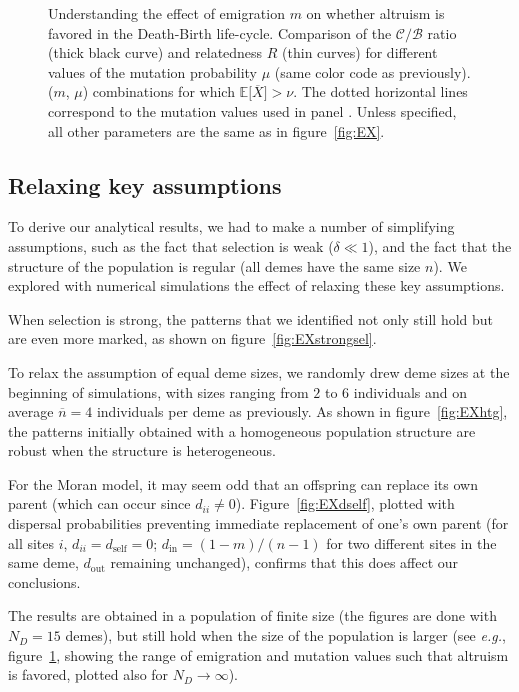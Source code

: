 \documentclass[11pt, letterpaper]{article}
\newcommand{\eg}{\textit{e.g.}}
\newcommand{\Esp}[1]{\mathbb{E}\big[ #1\big]}%
\newcommand{\mutbias}{\nu}
\newcommand{\self}{\textrm{self}}
\newcommand{\inn}{\textrm{in}}
\newcommand{\out}{\textrm{out}}
\newcommand{\din}{d_{\inn}}
\newcommand{\dself}{d_{\self}}
\newcommand{\dout}{d_{\out}}
\newcommand{\ndemes}{N_D}
\newcommand{\selstr}{\delta}
\begin{document}
\begin{figure}
\begin{tabular}{cc}
\end{tabular}
\caption{Understanding the effect of emigration $m$ on whether altruism is favored in the Death-Birth life-cycle.  Comparison of the $\mathcal{C}/\mathcal{B}$ ratio (thick black curve) and relatedness $R$ (thin curves) for different values of the mutation probability $\mu$ (same color code as previously).  ($m$, $\mu$) combinations for which $\Esp{\overline{X}}>\mutbias$. The dotted horizontal lines correspond to the mutation values used in panel . Unless specified, all other parameters are the same as in figure~\ref{fig:EX}.
}
\label{fig:DB}
\end{figure}

\subsection{Relaxing key assumptions}

To derive our analytical results, we had to make a number of simplifying assumptions, such as the fact that selection is weak ($\selstr \ll 1$), and the fact that the structure of the population is regular (all demes have the same size $n$). We explored with numerical simulations the effect of relaxing these key assumptions. 

When selection is strong, the patterns that we identified not only still hold but are even more marked, as shown on figure~\ref{fig:EXstrongsel}. 

To relax the assumption of equal deme sizes, we randomly drew deme sizes at the beginning of simulations, with sizes ranging from $2$ to $6$ individuals and on average $\overline{n} = 4$ individuals per deme as previously. As shown in figure~\ref{fig:EXhtg}, the patterns initially obtained with a homogeneous population structure are robust when the structure is heterogeneous. 
 
For the Moran model, it may seem odd that an offspring can replace its own parent (which can occur since $d_{ii} \neq 0$). Figure~\ref{fig:EXdself}, plotted with dispersal probabilities preventing immediate replacement of one's own parent (for all sites $i$, $d_{ii}=\dself=0$; $\din = (1-m)/(n-1)$ for two different sites in the same deme, $\dout$ remaining unchanged), confirms that this does affect our conclusions. 

The results are obtained in a population of finite size (the figures are done with $\ndemes =15$ demes), but still hold when  the size of the population is larger (see \eg, figure~\ref{fig:DB}, showing the range of emigration and mutation values such that altruism is favored, plotted also for $\ndemes\to \infty$).
\end{document}
